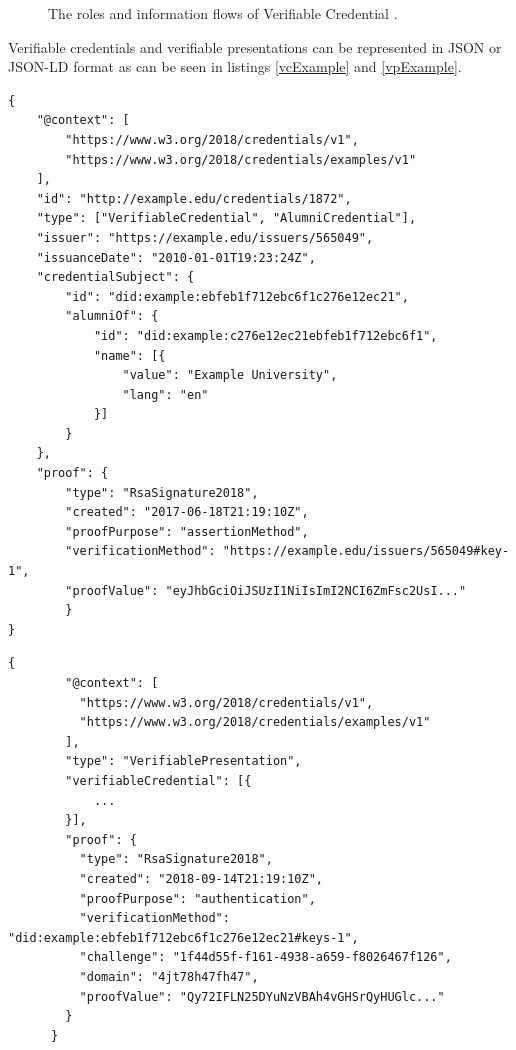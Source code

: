 \begin{figure}[h!]
    \centering
    
    \caption{The roles and information flows of Verifiable Credential \cite{vcW3C}.}
    \label{vcEcosystem}
\end{figure}

Verifiable credentials and verifiable presentations can be represented in JSON \cite{json-rfc3986} or JSON-LD \cite{json-ld} format as can be seen in listings \ref{vcExample} and \ref{vpExample}. 

\begin{lstlisting}[caption={A simple example of a verifiable credential \cite{vcW3C}.},captionpos=b,style=json, label={vcExample},breaklines=true,frame=single]
{
    "@context": [
        "https://www.w3.org/2018/credentials/v1",
        "https://www.w3.org/2018/credentials/examples/v1"
    ],
    "id": "http://example.edu/credentials/1872",
    "type": ["VerifiableCredential", "AlumniCredential"],
    "issuer": "https://example.edu/issuers/565049",
    "issuanceDate": "2010-01-01T19:23:24Z",
    "credentialSubject": {
        "id": "did:example:ebfeb1f712ebc6f1c276e12ec21",
        "alumniOf": {
            "id": "did:example:c276e12ec21ebfeb1f712ebc6f1",
            "name": [{
                "value": "Example University",
                "lang": "en"
            }]
        }
    },    
    "proof": {
        "type": "RsaSignature2018",
        "created": "2017-06-18T21:19:10Z",
        "proofPurpose": "assertionMethod",
        "verificationMethod": "https://example.edu/issuers/565049#key-1",
        "proofValue": "eyJhbGciOiJSUzI1NiIsImI2NCI6ZmFsc2UsI..."
        }
}
\end{lstlisting}

\begin{lstlisting}[caption={A simple example of a verifiable presentation \cite{vcW3C}.},captionpos=b,style=json, label={vpExample},breaklines=true,frame=single]
    {
        "@context": [
          "https://www.w3.org/2018/credentials/v1",
          "https://www.w3.org/2018/credentials/examples/v1"
        ],
        "type": "VerifiablePresentation",
        "verifiableCredential": [{
            ...
        }],
        "proof": {
          "type": "RsaSignature2018",
          "created": "2018-09-14T21:19:10Z",
          "proofPurpose": "authentication",
          "verificationMethod": "did:example:ebfeb1f712ebc6f1c276e12ec21#keys-1",
          "challenge": "1f44d55f-f161-4938-a659-f8026467f126",
          "domain": "4jt78h47fh47",
          "proofValue": "Qy72IFLN25DYuNzVBAh4vGHSrQyHUGlc..."
        }
      }   
\end{lstlisting}

